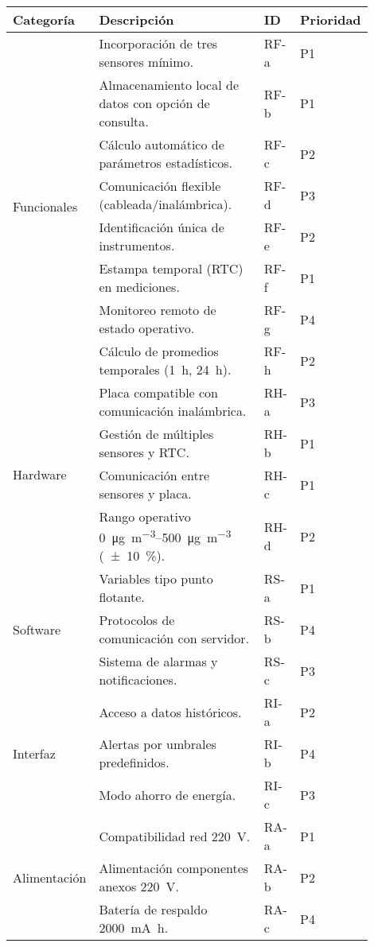 	\begin{tabular}{p{0.15\linewidth}p{0.55\linewidth}p{0.1\linewidth}p{0.1\linewidth}}
		\toprule
		\textbf{Categoría} & \textbf{Descripción} & \textbf{ID} & \textbf{Prioridad} \\
		\midrule
		\multirow{8}{*}{Funcionales} 
		& Incorporación de tres sensores \MPF mínimo. & RF-a & P1 \\
		& Almacenamiento local de datos con opción de consulta. & RF-b & P1 \\
		& Cálculo automático de parámetros estadísticos. & RF-c & P2 \\
		& Comunicación flexible (cableada/inalámbrica). & RF-d & P3 \\
		& Identificación única de instrumentos. & RF-e & P2 \\
		& Estampa temporal (RTC) en mediciones. & RF-f & P1 \\
		& Monitoreo remoto de estado operativo. & RF-g & P4 \\
		& Cálculo de promedios temporales (\SI{1}{\hour}, \SI{24}{\hour}). & RF-h & P2 \\
		\midrule
		\multirow{4}{*}{Hardware} 
		& Placa compatible con comunicación inalámbrica. & RH-a & P3 \\
		& Gestión de múltiples sensores y RTC. & RH-b & P1 \\
		& Comunicación entre sensores y placa. & RH-c & P1 \\
		& Rango operativo \SIrange{0}{500}{\micro\gram\per\cubic\meter} (\SI{\pm10}{\percent}). & RH-d & P2 \\
		\midrule
		\multirow{3}{*}{Software} 
		& Variables tipo punto flotante. & RS-a & P1 \\
		& Protocolos de comunicación con servidor. & RS-b & P4 \\
		& Sistema de alarmas y notificaciones. & RS-c & P3 \\
		\midrule
		\multirow{3}{*}{Interfaz} 
		& Acceso a datos históricos. & RI-a & P2 \\
		& Alertas por umbrales predefinidos. & RI-b & P4 \\
		& Modo ahorro de energía. & RI-c & P3 \\
		\midrule
		\multirow{3}{*}{Alimentación} 
		& Compatibilidad red \SI{220}{\volt}. & RA-a & P1 \\
		& Alimentación componentes anexos \SI{220}{\volt}. & RA-b & P2 \\
		& Batería de respaldo \SI{2000}{\milli\ampere\hour}. & RA-c & P4 \\

\end{tabular}

